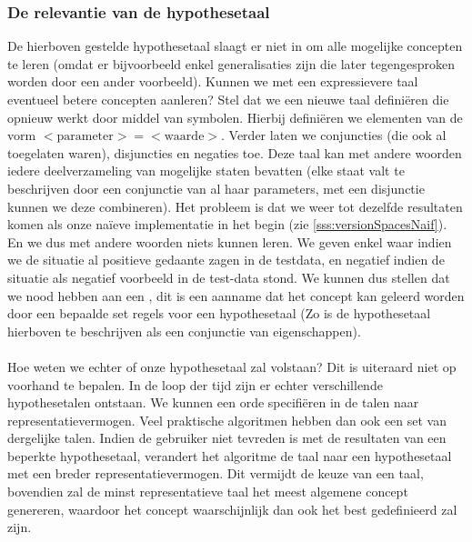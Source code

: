 \subsubsection{De relevantie van de hypothesetaal}
\label{sss:relevanceHypothesisLanguage}
De hierboven gestelde hypothesetaal slaagt er niet in om alle mogelijke concepten te leren (omdat er bijvoorbeeld enkel generalisaties zijn die later tegengesproken worden door een ander voorbeeld). Kunnen we met een expressievere taal eventueel betere concepten aanleren? Stel dat we een nieuwe taal defini\"eren die opnieuw werkt door middel van symbolen. Hierbij defini\"eren we elementen van de vorm $<\mbox{parameter}>=<\mbox{waarde}>$. Verder laten we conjuncties (die ook al toegelaten waren), disjuncties en negaties toe. Deze taal kan met andere woorden iedere deelverzameling van mogelijke staten bevatten (elke staat valt te beschrijven door een conjunctie van al haar parameters, met een disjunctie kunnen we deze combineren). Het probleem is dat we weer tot dezelfde resultaten komen als onze na\"ieve implementatie in het begin (zie \ref{sss:versionSpacesNaif}). En we dus met andere woorden niets kunnen leren. We geven enkel waar indien we de situatie al positieve gedaante zagen in de testdata, en negatief indien de situatie als negatief voorbeeld in de test-data stond. We kunnen dus stellen dat we nood hebben aan een , dit is een aanname dat het concept kan geleerd worden door een bepaalde set regels voor een hypothesetaal (Zo is de hypothesetaal hierboven te beschrijven als een conjunctie van eigenschappen).
\paragraph{}Hoe weten we echter of onze hypothesetaal zal volstaan? Dit is uiteraard niet op voorhand te bepalen. In de loop der tijd zijn er echter verschillende hypothesetalen ontstaan. We kunnen een orde specifi\"eren in de talen naar representatievermogen. Veel praktische algoritmen hebben dan ook een set van dergelijke talen. Indien de gebruiker niet tevreden is met de resultaten van een beperkte hypothesetaal, verandert het algoritme de taal naar een hypothesetaal met een breder representatievermogen. Dit vermijdt de keuze van een taal, bovendien zal de minst representatieve taal het meest algemene concept genereren, waardoor het concept waarschijnlijk dan ook het best gedefinieerd zal zijn.
